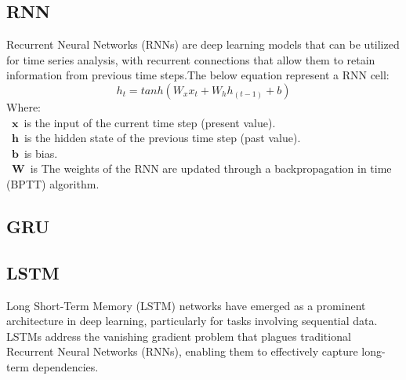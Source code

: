 \documentclass{ieeeojies}
\begin{document}
\subsection{RNN}
Recurrent Neural Networks (RNNs) are deep learning models that can be utilized for time series analysis, with recurrent connections that allow them to retain information from previous time steps.The below equation represent a RNN cell:
\[h_t=tanh⁡(W_x x_t+W_h h_(t-1)+b) \]
Where: \\ 
         \indent\textbullet\ \(\mathbf x\)\ is the input of the current time step (present value). \\
         \indent\textbullet\ \(\mathbf h\)\ is the hidden state of the previous time step (past value). \\
         \indent\textbullet\ \(\mathbf b\)\ is bias. \\
         \indent\textbullet\ \(\mathbf W\)\ is The weights of the RNN are updated through a backpropagation in time (BPTT) algorithm. \\
\subsection{GRU}
\subsection{LSTM}

Long Short-Term Memory (LSTM) networks \cite{b4} have emerged as a prominent architecture in deep learning, particularly for tasks involving sequential data. LSTMs address the vanishing gradient problem \cite{b5} that plagues traditional Recurrent Neural Networks (RNNs), enabling them to effectively capture long-term dependencies.
\end{document}
